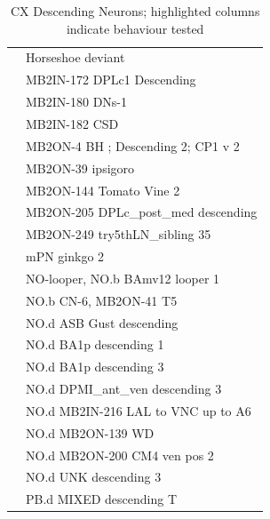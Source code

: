 \begin{table}
{\begin{tabular}{p{}|p{}}
            & Horseshoe deviant \\
            & \cellcolor{cxhl} MB2IN-172 DPLc1 Descending \\
            & MB2IN-180 DNs-1 \\
            & MB2IN-182 CSD \\
            & MB2ON-4 BH ; Descending 2; CP1 v 2 \\
            & \cellcolor{cxhl} MB2ON-39 ipsigoro \\
            & MB2ON-144 Tomato Vine 2 \\
            & MB2ON-205 DPLc\_post\_med descending \\
            & MB2ON-249 try5thLN\_sibling 35 \\
            & mPN ginkgo 2 \\
            & NO-looper, NO.b BAmv12 looper 1 \\
            & NO.b CN-6, MB2ON-41 T5 \\
            & NO.d ASB Gust descending \\
            & NO.d BA1p descending 1 \\
            & NO.d BA1p descending 3 \\
            & \cellcolor{cxhl} NO.d DPMI\_ant\_ven descending 3 \\
            & NO.d MB2IN-216 LAL to VNC up to A6 \\
            & NO.d MB2ON-139 WD \\
            & NO.d MB2ON-200 CM4 ven pos 2 \\
            & NO.d UNK descending 3 \\
            & PB.d MIXED descending T \\
            \bottomrule
        \end{tabular}%
        }
        \caption[CX Descending Neurons]{CX Descending Neurons; highlighted columns indicate behaviour tested}
        \label{CXDescending}
    \end{table}



